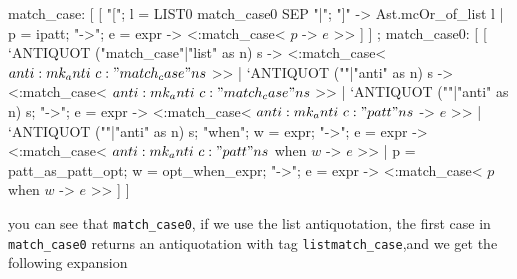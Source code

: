 \begin{enumerate}
\begin{bluetext}
    match_case:
      [ [ "["; l = LIST0 match_case0 SEP "|"; "]" -> Ast.mcOr_of_list l
        | p = ipatt; "->"; e = expr -> <:match_case< $p$ -> $e$ >> ] ]
    ;
    match_case0:
      [ [ `ANTIQUOT ("match_case"|"list" as n) s ->
            <:match_case< $anti:mk_anti ~c:"match_case" n s$ >>
        | `ANTIQUOT (""|"anti" as n) s ->
            <:match_case< $anti:mk_anti ~c:"match_case" n s$ >>
        | `ANTIQUOT (""|"anti" as n) s; "->"; e = expr ->
            <:match_case< $anti:mk_anti ~c:"patt" n s$ -> $e$ >>
        | `ANTIQUOT (""|"anti" as n) s; "when"; w = expr; "->"; e = expr ->
            <:match_case< $anti:mk_anti ~c:"patt" n s$ when $w$ -> $e$ >>
        | p = patt_as_patt_opt; w = opt_when_expr; "->"; e = expr -> <:match_case< $p$ when $w$ -> $e$ >>
      ] ]
    \end{bluetext}
    
you can see that \verb|match_case0|, if we use the list antiquotation,
the first case in \verb|match_case0| returns an antiquotation with tag
\verb|listmatch_case|,and we get the following expansion


\end{enumerate}
